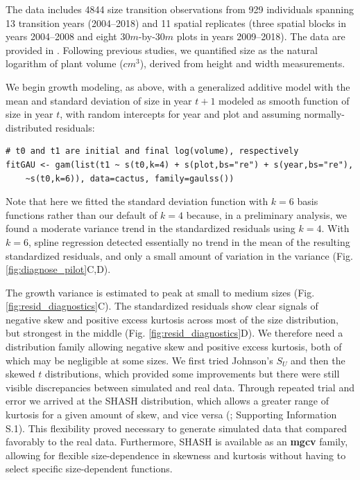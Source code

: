 \documentclass[12pt]{article}
\begin{document}
\begin{spacing}{1.9}
The data includes 4844 size transition observations from 929 individuals spanning 13 transition years (2004--2018) and 11 spatial replicates (three spatial blocks in years 2004--2008 and eight $30m$-by-$30m$ plots in years 2009--2018). 
The data are provided in \cite{cactusdata}.
Following previous studies, we quantified size as the natural logarithm of plant volume ($cm^3$), derived from height and width measurements. 

We begin growth modeling, as above, with a generalized additive model with the mean and standard deviation of size in year $t+1$ modeled as smooth function of size in year $t$, with random intercepts for year and plot and assuming normally-distributed residuals:
\begin{lstlisting}
# t0 and t1 are initial and final log(volume), respectively
fitGAU <- gam(list(t1 ~ s(t0,k=4) + s(plot,bs="re") + s(year,bs="re"), 
	~s(t0,k=6)), data=cactus, family=gaulss())
\end{lstlisting}
Note that here we fitted the standard deviation function with $k=6$ basis functions rather than our default of $k=4$ because, in a preliminary analysis, we found a moderate variance trend in the standardized residuals using $k=4$. 
With $k=6$, spline regression detected essentially no trend in the mean of the resulting standardized residuals, and only a small amount of variation in the variance (Fig. \ref{fig:diagnose_pilot}C,D).

The growth variance is estimated to peak at small to medium sizes (Fig. \ref{fig:resid_diagnostics}C). 
The standardized residuals show clear signals of negative skew and positive excess kurtosis across most of the size distribution, but strongest in the middle (Fig. \ref{fig:resid_diagnostics}D).
We therefore need a distribution family allowing negative skew and positive excess kurtosis, both of which may be negligible at some sizes.
We first tried Johnson's $S_{U}$ and then the skewed $t$ distributions, which provided some improvements but there were still visible discrepancies between simulated and real data. 
Through repeated trial and error we arrived at the SHASH distribution, which 
allows a greater range of kurtosis for a given amount of skew, and vice versa (\cite{jones-pewsey-2009}; Supporting Information S.1). 
This flexibility proved necessary to generate simulated data that compared favorably to the real data. 
Furthermore, SHASH is available as an \textbf{mgcv} family, allowing for flexible size-dependence in skewness and kurtosis without having to select specific size-dependent functions. 


\end{spacing}
\end{document}
